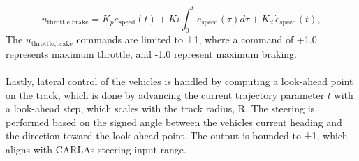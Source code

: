 \begin{equation}
\label{long}
    u_\text{throttle,brake} =  K_pe_\text{speed}(t)+ Ki \int_0^te_\text{speed}(\tau)d\tau + K_d\, \dot{e}_\text{speed}(t), 
\end{equation}
The \(u_\text{throttle,brake}\) commands are limited to ±1, where a command of +1.0 represents maximum throttle, and -1.0 represent maximum braking.  
\\\\
 Lastly, lateral control of the vehicles is handled by computing a look-ahead point on the track, which is done by advancing the current trajectory parameter \(t\) with a look-ahead step, which scales with the track radius, R. The steering is performed based on the signed angle between the vehicles current heading and the direction toward the look-ahead point. The output is bounded to ±1, which aligns with CARLAs steering input range.
